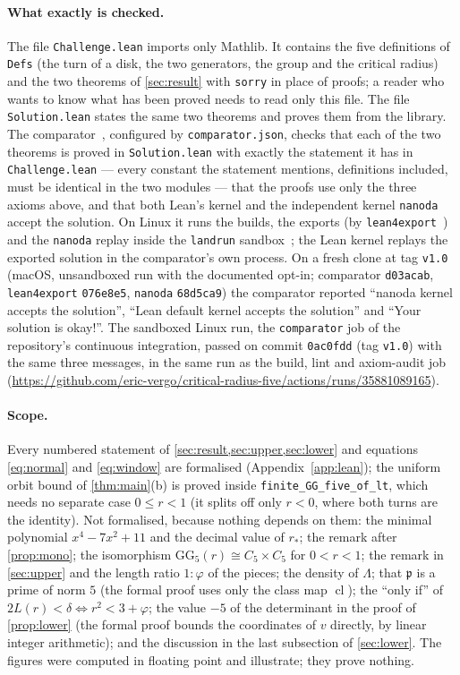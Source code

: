 \documentclass[11pt,a4paper]{article}
\newcommand{\GG}{\mathrm{GG}}
\newcommand{\rs}{r_{\ast}}
\newcommand{\Lam}{\Lambda}
\newcommand{\cls}{\operatorname{cl}}
\newcommand{\leanname}[1]{\texttt{\small #1}}
\begin{document}
\paragraph{What exactly is checked.}
The file \texttt{Challenge.lean} imports only Mathlib. It contains the five definitions of
\texttt{Defs} (the turn of a disk, the two generators, the group and the critical radius) and the
two theorems of \cref{sec:result} with \texttt{sorry} in place of proofs; a reader who wants to know
what has been proved needs to read only this file. The file \texttt{Solution.lean} states the same
two theorems and proves them from the library. The comparator~\cite{comparator}, configured by
\texttt{comparator.json}, checks that each of the two theorems is proved in \texttt{Solution.lean}
with exactly the statement it has in \texttt{Challenge.lean} --- every constant the statement
mentions, definitions included, must be identical in the two modules --- that the proofs use only
the three axioms above, and that both Lean's kernel and the independent kernel
\texttt{nanoda}~\cite{nanoda} accept the solution. On Linux it runs the builds, the exports (by
\texttt{lean4export}~\cite{lean4export}) and the \texttt{nanoda} replay inside the \texttt{landrun}
sandbox~\cite{landrun}; the Lean kernel replays the exported solution in the comparator's own
process. On a fresh clone at tag \texttt{v1.0} (macOS, unsandboxed run with the documented opt-in;
comparator \texttt{d03acab}, \texttt{lean4export} \texttt{076e8e5}, \texttt{nanoda} \texttt{68d5ca9})
the comparator reported ``nanoda kernel accepts the solution'', ``Lean default kernel accepts the
solution'' and ``Your solution is okay!''. The sandboxed Linux run, the \texttt{comparator} job of
the repository's continuous integration, passed on commit \texttt{0ac0fdd} (tag \texttt{v1.0})
with the same three messages, in the same run as the build, lint and axiom-audit job
(\url{https://github.com/eric-vergo/critical-radius-five/actions/runs/35881089165}).

\paragraph{Scope.}
Every numbered statement of \cref{sec:result,sec:upper,sec:lower} and equations \eqref{eq:normal}
and \eqref{eq:window} are formalised (Appendix~\ref{app:lean}); the uniform orbit bound of
\cref{thm:main}(b) is proved inside \leanname{finite\_GG\_five\_of\_lt}, which needs no separate
case $0\le r<1$ (it splits off only $r<0$, where both turns are the identity). Not formalised,
because nothing depends on them: the minimal polynomial $x^4-7x^2+11$ and the decimal value of
$\rs$; the remark after \cref{prop:mono}; the isomorphism
$\GG_5(r)\cong C_5\times C_5$ for $0<r<1$; the remark in \cref{sec:upper} and the length ratio
$1:\varphi$ of the pieces; the density of $\Lam$; that $\mathfrak p$ is a prime of norm $5$ (the
formal proof uses only the class map $\cls$); the ``only if'' of $2L(r)<\delta\iff r^2<3+\varphi$;
the value $-5$ of the determinant in the proof of \cref{prop:lower} (the formal proof bounds the
coordinates of $v$ directly, by linear integer arithmetic); and the discussion in the last
subsection of \cref{sec:lower}. The figures were computed in floating point and illustrate; they
prove nothing.
\end{document}
